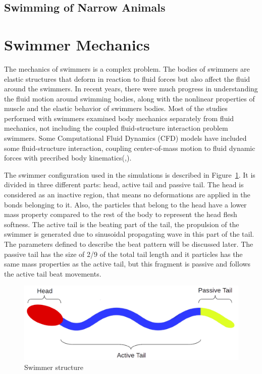 \subsection{Swimming of Narrow Animals}
\label{sec:section 1}





\section{Swimmer Mechanics}
\label{sec:section 2}
The mechanics of swimmers is a complex problem\cite{tytell_interactions_2010}. The bodies of swimmers are elastic structures that deform in reaction to fluid forces but also affect the fluid around the swimmers.
In recent years, there were much progress in understanding the fluid motion around swimming bodies\cite{shadwick_fish_2006}, along with the nonlinear properties of muscle\cite{williams_new_2010} and the elastic behavior of 
swimmers bodies\cite{williams_new_2010}. Most of the studies performed with swimmers examined body mechanics separately from fluid mechanics, not including the coupled
fluid-structure interaction problem swimmers. Some Computational Fluid Dynamics (CFD) models have included some fluid-structure interaction, coupling center-of-mass motion to 
fluid dynamic forces with precribed body kinematics(\cite{kern_simulations_2006},\cite{borazjani_role_2010}).

\par

The swimmer configuration used in the simulations is described in Figure~\ref{fig:Bild1}. It is divided in three different parts: head, active tail and passive tail. The head 
is considered as an inactive region, that means no deformations are applied in the bonds belonging to it. Also, the particles that belong to the head have a lower mass property
compared to the rest of the body to represent the head flesh softness. The active tail is the beating part of the tail, the propulsion of the swimmer is generated due to sinusoidal 
propagating wave in this part of the tail. The parameters defined to describe the beat pattern will be discussed later. The passive tail has the size of 2/9 of the total tail length
and it particles has the same mass properties as the active tail, but this fragment is passive and follows the active tail beat movements. 


\begin{figure}[ht]
  \centering
  \begin{footnotesize}
  \includegraphics[scale=0.25]{images/swimmer-struc.png}
  \caption[Swimmer Structure]{Swimmer structure}
  \label{fig:Bild1}
  \end{footnotesize}
\end{figure} 


